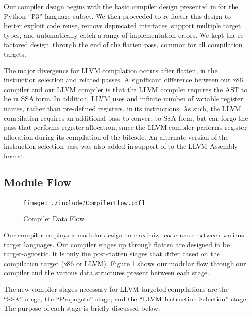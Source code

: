 \documentclass[11pt,twocolumn]{article}
\begin{document}
Our compiler design begins with the basic compiler design presented in
\cite{siek-chang} for the Python ``P3'' language subset.  We then
proceeded to re-factor this design to better exploit code reuse,
remove deprecated interfaces, support multiple target types, and
automatically catch a range of implementation errors. We kept the re-factored 
design, through the end of the flatten pass, common for all compilation 
targets.

The major divergence for LLVM compilation occurs after flatten, in the 
instruction selection and related passes. A significant difference between 
our x86
compiler and our LLVM compiler is that the LLVM compiler requires the
AST to be in SSA form. In addition, LLVM uses and infinite number of variable 
register names, rather than pre-defined registers, in its instructions. As 
such, the LLVM compilation requires an additional pass to convert to SSA form,
but can forgo the pass that performs register allocation, since the LLVM 
compiler performs register allocation during its compilation of the bitcode.
 An alternate version of the instruction selection pass was also added in 
 support of to the LLVM Assembly format.

\subsection{Module Flow}
\label{sec:ModuleFlow}

\begin{figure}[htb]
   \centering
   \texttt{[image: ./include/CompilerFlow.pdf]}
   \caption{Compiler Data Flow}
   \label{fig:CompilerFlow}
\end{figure}

Our compiler employs a modular design to maximize code reuse between
various target languages.  Our compiler stages up through flatten are
designed to be target-agnostic. It is only the post-flatten stages
that differ based on the compilation target (x86 or LLVM). Figure
\ref{fig:CompilerFlow} shows our modular flow through our compiler and
the various data structures present between each stage.

The new compiler stages necessary for LLVM targeted compilations are
the ``SSA'' stage, the ``Propagate'' stage, and the ``LLVM Instruction
Selection'' stage. The purpose of each stage is briefly discussed
below.
\end{document}
